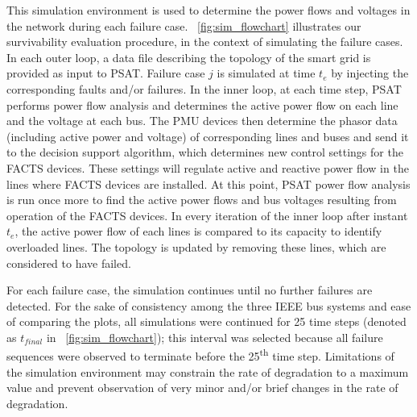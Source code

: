 \documentclass[review]{elsarticle}
\begin{document}
This simulation environment is used to determine the power flows and voltages in the network during each failure case. \figurename~\ref{fig:sim_flowchart} illustrates our survivability evaluation procedure, in the context of simulating the failure cases. In each outer loop, a data file describing the topology of the smart grid is provided as input to PSAT. Failure case $j$ is simulated at time $t_e$ by injecting the corresponding faults and/or failures. In the inner loop, at each time step, PSAT performs power flow analysis and determines the active power flow on each line and the voltage at each bus. The PMU devices then determine the phasor data (including active power and voltage) of corresponding lines and buses and send it to the decision support algorithm, which determines new control settings for the FACTS devices. These settings will regulate active and reactive power flow in the lines where FACTS devices are installed. At this point, PSAT power flow analysis is run once more to find the active power flows and bus voltages resulting from operation of the FACTS devices. In every iteration of the inner loop after instant $t_e$, the active power flow of each lines is compared to its capacity to identify overloaded lines. The topology is updated by removing these lines, which are considered to have failed.

For each failure case, the simulation continues until no further failures are detected. For the sake of consistency among the three IEEE bus systems and ease of comparing the plots, all simulations were continued for 25 time steps (denoted as $t_{final}$ in \figurename~\ref{fig:sim_flowchart}); this interval was selected because all failure sequences were observed to terminate before the 25\textsuperscript{th} time step. Limitations of the simulation environment may constrain the rate of degradation to a maximum value and prevent observation of very minor and/or brief changes in the rate of degradation.
\end{document}
